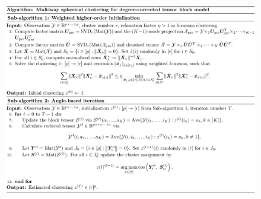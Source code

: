 \documentclass[twoside]{article}
\theoremstyle{definition}
\theoremstyle{definition}
\newcommand\Algphase[1]{%
\vspace*{-.7\baselineskip}\Statex\hspace*{\dimexpr-\algorithmicindent-2pt\relax}\rule{\textwidth}{0.4pt}%
\Statex\hspace*{-\algorithmicindent}\textbf{#1}%
\vspace*{-.7\baselineskip}\Statex\hspace*{\dimexpr-\algorithmicindent-2pt\relax}\rule{\textwidth}{0.4pt}%
} %
\providecommand{\DIFaddbegin}{} %
\newcommand{\DIFaddincludegraphics}[2][]{{\color{blue}\fbox{\DIFOincludegraphics[#1]{#2}}}} %
\DeclareRobustCommand{\DIFaddbegin}{\DIFOaddbegin \let\includegraphics\DIFaddincludegraphics} %
\begin{document}
\DIFaddbegin \begin{figure}[h]
    \centering
    \vspace{-.5cm}
    \includegraphics[width=1\textwidth]{algorithm.pdf}
  \vspace{-1cm}
    \label{alg:main}
\end{figure}


\end{document}
